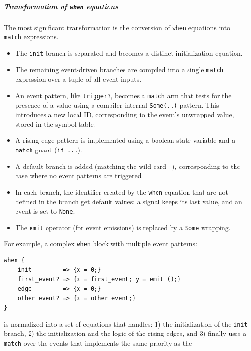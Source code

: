 \begin{enumerate}
          \subparagraph{Transformation of \texttt{when} equations}
          The most significant transformation is the conversion of \texttt{when} equations into
          \texttt{match} expressions.
          \begin{itemize}
              \item The \texttt{init} branch is separated and becomes a distinct initialization
                    equation.
              \item The remaining event-driven branches are compiled into a single \texttt{match}
                    expression over a tuple of all event inputs.
              \item An event pattern, like \texttt{trigger?}, becomes a \texttt{match} arm that
                    tests for the presence of a value using a compiler-internal \texttt{Some(..)}
                    pattern. This introduces a new local ID, corresponding to the event's unwrapped
                    value, stored in the symbol table.
              \item A rising edge pattern is implemented using a boolean state variable and a
                    \texttt{match} guard (\texttt{if ...}).
              \item A default branch is added (matching the wild card \texttt{\_}), corresponding
                    to the case where no event patterns are triggered.
              \item In each branch, the identifier created by the \texttt{when} equation that are
                    not defined in the branch get default values: a signal keeps its last value, and
                    an event is set to \texttt{None}.
              \item The \texttt{emit} operator (for event emissions) is replaced by a \texttt{Some}
                    wrapping.
          \end{itemize}
          For example, a complex \texttt{when} block with multiple event patterns:
          \begin{lstlisting}[language=GRust]
when {
    init         => {x = 0;}
    first_event? => {x = first_event; y = emit ();}
    edge         => {x = 0;}
    other_event? => {x = other_event;}
}
\end{lstlisting}
          is normalized into a set of equations that handles:
          1) the initialization of the \texttt{init} branch,
          2) the initialization and the logic of the rising edges, and
          3) finally uses a \texttt{match} over the events that implements the same priority as the

\end{enumerate}
